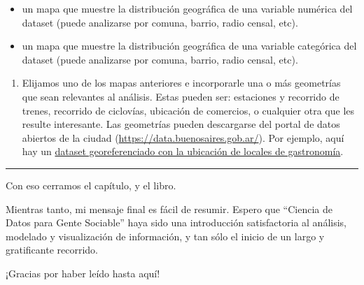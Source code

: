 \documentclass[spanish,]{book}
\providecommand{\tightlist}{%
  \setlength{\itemsep}{0pt}\setlength{\parskip}{0pt}}
\begin{document}
\begin{itemize}
\item
  un mapa que muestre la distribución geográfica de una variable numérica del dataset (puede analizarse por comuna, barrio, radio censal, etc).
\item
  un mapa que muestre la distribución geográfica de una variable categórica del dataset (puede analizarse por comuna, barrio, radio censal, etc).
\end{itemize}

\begin{enumerate}
\def\labelenumi{\Roman{enumi}.}
\setcounter{enumi}{2}
\tightlist
\item
  Elijamos uno de los mapas anteriores e incorporarle una o más geometrías que sean relevantes al análisis. Estas pueden ser: estaciones y recorrido de trenes, recorrido de ciclovías, ubicación de comercios, o cualquier otra que les resulte interesante. Las geometrías pueden descargarse del portal de datos abiertos de la ciudad (\url{https://data.buenosaires.gob.ar/}). Por ejemplo, aquí hay un \href{https://data.buenosaires.gob.ar/dataset/oferta-establecimientos-gastronomicos}{dataset georeferenciado con la ubicación de locales de gastronomía}.
\end{enumerate}

\begin{center}\rule{0.5\linewidth}{0.5pt}\end{center}

Con eso cerramos el capítulo, y el libro.

Mientras tanto, mi mensaje final es fácil de resumir. Espero que ``Ciencia de Datos para Gente Sociable'' haya sido una introducción satisfactoria al análisis, modelado y visualización de información, y tan sólo el inicio de un largo y gratificante recorrido.

¡Gracias por haber leído hasta aquí!


\end{document}
